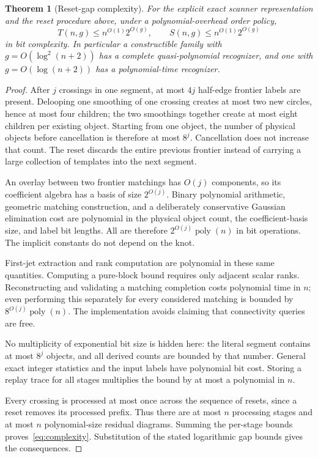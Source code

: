 \documentclass[11pt]{article}
\newtheorem{theorem}{Theorem}[section]
\theoremstyle{definition}\newtheorem{definition}[theorem]{Definition}\newtheorem{example}[theorem]{Example}
\theoremstyle{remark}\newtheorem{remark}[theorem]{Remark}
\newcommand{\poly}{\operatorname{poly}}
\begin{document}
\begin{theorem}[Reset-gap complexity]\label{thm:complexity}
For the explicit exact scanner representation and the reset procedure above, under a polynomial-overhead order policy,
\begin{equation}\label{eq:complexity}
 T(n,g)\le n^{O(1)}2^{O(g)},\qquad
 S(n,g)\le n^{O(1)}2^{O(g)}
\end{equation}
in bit complexity. In particular a constructible family with $g=O(\log^2(n+2))$ has a complete quasi-polynomial recognizer, and one with $g=O(\log(n+2))$ has a polynomial-time recognizer.
\end{theorem}
\begin{proof}
After $j$ crossings in one segment, at most $4j$ half-edge frontier labels are present. Delooping one smoothing of one crossing creates at most two new circles, hence at most four children; the two smoothings together create at most eight children per existing object. Starting from one object, the number of physical objects before cancellation is therefore at most $8^j$. Cancellation does not increase that count. The reset discards the entire previous frontier instead of carrying a large collection of templates into the next segment.

An overlay between two frontier matchings has $O(j)$ components, so its coefficient algebra has a basis of size $2^{O(j)}$. Binary polynomial arithmetic, geometric matching construction, and a deliberately conservative Gaussian elimination cost are polynomial in the physical object count, the coefficient-basis size, and label bit lengths. All are therefore $2^{O(j)}\poly(n)$ in bit operations. The implicit constants do not depend on the knot.

First-jet extraction and rank computation are polynomial in these same quantities. Computing a pure-block bound requires only adjacent scalar ranks. Reconstructing and validating a matching completion costs polynomial time in $n$; even performing this separately for every considered matching is bounded by $8^{O(j)}\poly(n)$. The implementation avoids claiming that connectivity queries are free.

No multiplicity of exponential bit size is hidden here: the literal segment contains at most $8^j$ objects, and all derived counts are bounded by that number. General exact integer statistics and the input labels have polynomial bit cost. Storing a replay trace for all stages multiplies the bound by at most a polynomial in $n$.

Every crossing is processed at most once across the sequence of resets, since a reset removes its processed prefix. Thus there are at most $n$ processing stages and at most $n$ polynomial-size residual diagrams. Summing the per-stage bounds proves~\eqref{eq:complexity}. Substitution of the stated logarithmic gap bounds gives the consequences.
\end{proof}
\end{document}
